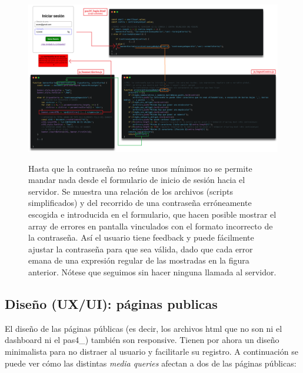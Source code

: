 \documentclass[a4paper,12pt]{report}
\begin{document}
		
		\FloatBarrier
		\setlength{\belowcaptionskip}{3pt}
		\begin{figure}[H]
			\centering
			\caption{Hasta que la contraseña no reúne unos mínimos no se permite mandar nada desde el formulario de inicio de sesión hacia el servidor. Se muestra una relación de los archivos (scripts simplificados) y del recorrido de una contraseña erróneamente escogida e introducida en el formulario, que hacen posible mostrar el array de errores en pantalla vinculados con el formato incorrecto de la contraseña. Así el usuario tiene feedback y puede fácilmente ajustar la contraseña para que sea válida, dado que cada error emana de una expresión regular de las mostradas en la figura anterior. Nótese que seguimos sin hacer ninguna llamada al servidor.}
			\includegraphics[width=1\linewidth]{img/activacioBannerAlertesLoginContrasenya}
			\label{fig:activacioBannerAlertesLoginContrasenya}
		\end{figure}
		\FloatBarrier
		
		
		
		
		
		
		
		
	
	\subsection{Diseño (UX/UI): páginas publicas}
	\label{sec:disenyoPublicas}
	
	El diseño de las páginas públicas (es decir, los archivos html que no son ni el dashboard ni el pas4\_) también son responsive. Tienen por ahora un diseño minimalista para no distraer al usuario y facilitarle su registro. A continuación se puede ver cómo las distintas \textit{media queries} afectan a dos de las páginas públicas:
	
\end{document}
